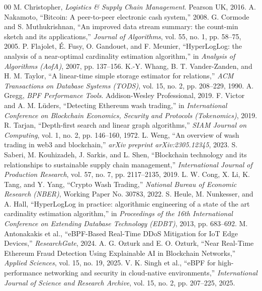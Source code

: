 \documentclass[conference]{IEEEtran}
\begin{document}
\begin{thebibliography}{00}
 M. Christopher, \textit{Logistics \& Supply Chain Management}. Pearson UK, 2016.
 A. Nakamoto, ``Bitcoin: A peer-to-peer electronic cash system,'' 2008.
 G. Cormode and S. Muthukrishnan, ``An improved data stream summary: the count-min sketch and its applications,'' \textit{Journal of Algorithms}, vol. 55, no. 1, pp. 58--75, 2005.
 P. Flajolet, É. Fusy, O. Gandouet, and F. Meunier, ``HyperLogLog: the analysis of a near-optimal cardinality estimation algorithm,'' in \textit{Analysis of Algorithms (AofA)}, 2007, pp. 137--156.
 K.-Y. Whang, B. T. Vander-Zanden, and H. M. Taylor, ``A linear-time simple storage estimator for relations,'' \textit{ACM Transactions on Database Systems (TODS)}, vol. 15, no. 2, pp. 208--229, 1990.
 A. Gregg, \textit{BPF Performance Tools}. Addison-Wesley Professional, 2019.
 F. Victor and A. M. Lüders, ``Detecting Ethereum wash trading,'' in \textit{International Conference on Blockchain Economics, Security and Protocols (Tokenomics)}, 2019.
 R. Tarjan, ``Depth-first search and linear graph algorithms,'' \textit{SIAM Journal on Computing}, vol. 1, no. 2, pp. 146--160, 1972.
 L. Weng, ``An overview of wash trading in web3 and blockchain,'' \textit{arXiv preprint arXiv:2305.12345}, 2023.
 S. Saberi, M. Kouhizadeh, J. Sarkis, and L. Shen, ``Blockchain technology and its relationships to sustainable supply chain management,'' \textit{International Journal of Production Research}, vol. 57, no. 7, pp. 2117--2135, 2019.
 L. W. Cong, X. Li, K. Tang, and Y. Yang, ``Crypto Wash Trading,'' \textit{National Bureau of Economic Research (NBER)}, Working Paper No. 30783, 2022.
 S. Heule, M. Nunkesser, and A. Hall, ``HyperLogLog in practice: algorithmic engineering of a state of the art cardinality estimation algorithm,'' in \textit{Proceedings of the 16th International Conference on Extending Database Technology (EDBT)}, 2013, pp. 683--692.
 M. Antonakakis et al., ``eBPF-Based Real-Time DDoS Mitigation for IoT Edge Devices,'' \textit{ResearchGate}, 2024.
 A. G. Ozturk and E. O. Ozturk, ``Near Real-Time Ethereum Fraud Detection Using Explainable AI in Blockchain Networks,'' \textit{Applied Sciences}, vol. 15, no. 19, 2025.
 V. K. Singh et al., ``eBPF for high-performance networking and security in cloud-native environments,'' \textit{International Journal of Science and Research Archive}, vol. 15, no. 2, pp. 207--225, 2025.
\end{thebibliography}
\end{document}
